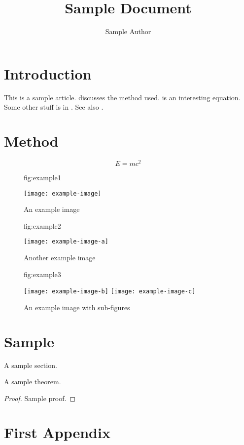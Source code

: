 \documentclass{article}
\title{Sample Document}
\author{Sample Author}
\begin{document}
\maketitle

\begin{abstract}
\lipsum[1]
\end{abstract}

\section{Introduction}

This is a sample article.  discusses
the method used.  is an interesting
equation. Some other stuff is in .
See also .

\lipsum[1]

\section{Method}\label{sec:method}

\lipsum[2]

\begin{equation}\label{eq:emc2}
E = mc^{2}
\end{equation}

\lipsum[3]

\begin{figure}
\floatconts
 {fig:example1}%
 {\caption{An example image}}%
 {\texttt{[image: example-image]}}%
\end{figure}

\begin{figure}
\floatconts
 {fig:example2}%
 {\caption{Another example image}}%
 {\texttt{[image: example-image-a]}}%
\end{figure}

\begin{figure}
\floatconts
 {fig:example3}%
 {\caption{An example image with sub-figures}}%
 {%
  \subfigure
   {\label{fig:sub-a}\texttt{[image: example-image-b]}}%
  \quad
  \subfigure
   {\label{fig:sub-b}\texttt{[image: example-image-c]}}%
 }
\end{figure}


\section{Sample}
A sample section.

\begin{theorem}
A sample theorem.
\begin{proof}
Sample proof.
\end{proof}
\end{theorem}

\appendix
\section{First Appendix}\label{apd:first}

\lipsum
\end{document}
